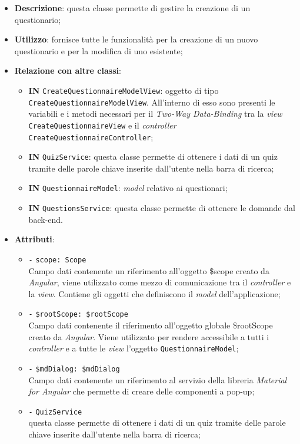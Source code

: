 \begin{itemize}
	\item \textbf{Descrizione}: questa classe permette di gestire la creazione di un questionario;
	\item \textbf{Utilizzo}: fornisce tutte le funzionalità per la creazione di un nuovo questionario e per la modifica di uno esistente;
	\item \textbf{Relazione con altre classi}:
	\begin{itemize}
		\item \textbf{IN} \texttt{CreateQuestionnaireModelView}: oggetto di tipo \texttt{CreateQuestionnaireModelView}. All'interno di esso sono presenti le variabili e i metodi necessari per il \textit{Two-Way Data-Binding} tra la \textit{view} \texttt{CreateQuestionnaireView} e il \textit{controller} \\ \texttt{CreateQuestionnaireController}; 
		\item \textbf{IN} \texttt{QuizService}: questa classe permette di ottenere i dati di un quiz tramite delle parole chiave inserite dall'utente nella barra di ricerca;
		\item \textbf{IN} \texttt{QuestionnaireModel}: \textit{model} relativo ai questionari;
		\item \textbf{IN} \texttt{QuestionsService}: questa classe permette di ottenere le domande dal back-end.
	\end{itemize}
	\item \textbf{Attributi}:
	\begin{itemize}
		\item \texttt{-} \texttt{scope: Scope} \\
		Campo dati contenente un riferimento all'oggetto \$scope creato da \textit{Angular}, viene utilizzato come mezzo di comunicazione tra il \textit{controller} e la \textit{view}. Contiene gli oggetti che definiscono il \textit{model} dell'applicazione;
		\item \texttt{-} \texttt{\$rootScope: \$rootScope} \\
		Campo dati contenente il riferimento all'oggetto globale \$rootScope creato da \textit{Angular}. Viene utilizzato per rendere accessibile a tutti i \textit{controller} e a tutte le \textit{view} l'oggetto \texttt{QuestionnaireModel};
		\item \texttt{-} \texttt{\$mdDialog: \$mdDialog} \\
		Campo dati contenente un riferimento al servizio della libreria \textit{Material for Angular} che permette di creare delle componenti a pop-up;
		\item \texttt{-} \texttt{QuizService} \\ questa classe permette di ottenere i dati di un quiz tramite delle parole chiave inserite dall'utente nella barra di ricerca;
		

\end{itemize}
\end{itemize}
